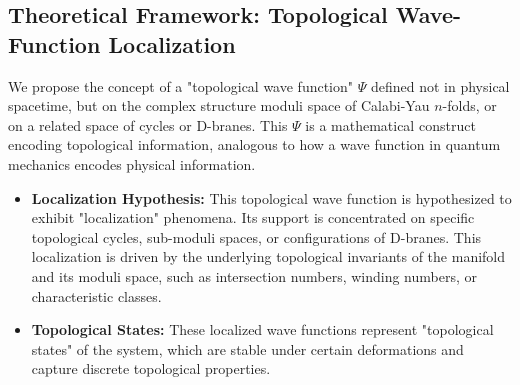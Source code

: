 \documentclass{book}
\theoremstyle{definition}
\begin{document}
\subsection{Theoretical Framework: Topological Wave-Function Localization}
We propose the concept of a "topological wave function" $\Psi$ defined not in physical spacetime, but on the complex structure moduli space of Calabi-Yau $n$-folds, or on a related space of cycles or D-branes. This $\Psi$ is a mathematical construct encoding topological information, analogous to how a wave function in quantum mechanics encodes physical information.
\begin{itemize}
    \item \textbf{Localization Hypothesis:} This topological wave function is hypothesized to exhibit "localization" phenomena. Its support is concentrated on specific topological cycles, sub-moduli spaces, or configurations of D-branes. This localization is driven by the underlying topological invariants of the manifold and its moduli space, such as intersection numbers, winding numbers, or characteristic classes.
    \item \textbf{Topological States:} These localized wave functions represent "topological states" of the system, which are stable under certain deformations and capture discrete topological properties.
\end{itemize}
\end{document}
